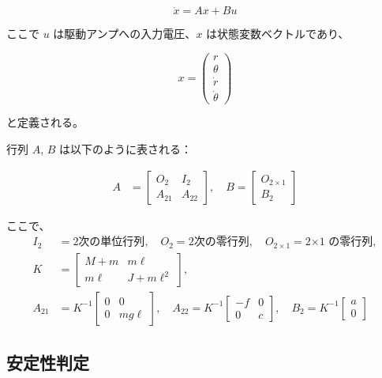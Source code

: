 \documentclass[10pt,a4paper,titlepage]{jreport} %
\begin{document}
\begin{equation}
\dot{x} = A x + B u
\end{equation}

ここで $u$ は駆動アンプへの入力電圧、$x$ は状態変数ベクトルであり、

\begin{equation}
x = \begin{pmatrix}
r \\
\theta \\
\dot{r} \\
\dot{\theta}
\end{pmatrix}
\end{equation}

と定義される。

行列 $A$, $B$ は以下のように表される：

\begin{align}
A &= \begin{bmatrix}
O_2 & I_2 \\
A_{21} & A_{22}
\end{bmatrix}, \quad
B = \begin{bmatrix}
O_{2 \times 1} \\
B_2
\end{bmatrix}
\end{align}

ここで、
\begin{align*}
I_2 &= \text{2次の単位行列}, \quad
O_2 = \text{2次の零行列}, \quad
O_{2 \times 1} = \text{2×1 の零行列}, \\
K &= \begin{bmatrix}
M + m & m\ell \\
m\ell & J + m\ell^2
\end{bmatrix}, \\
A_{21} &= K^{-1} \begin{bmatrix}
0 & 0 \\
0 & mg\ell
\end{bmatrix}, \quad
A_{22} = K^{-1} \begin{bmatrix}
-f & 0 \\
0 & c
\end{bmatrix}, \quad
B_2 = K^{-1} \begin{bmatrix}
a \\
0
\end{bmatrix}
\end{align*}

\subsection*{安定性判定}
\end{document}
